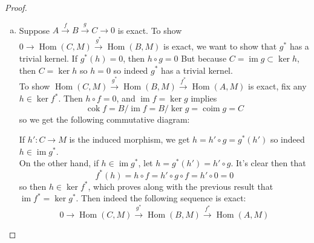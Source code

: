 \documentclass{article}
\DeclareMathOperator{\im}{im}
\DeclareMathOperator{\coim}{coim}
\DeclareMathOperator{\cok}{cok}
\DeclareMathOperator{\Hom}{Hom}
\begin{document}
\begin{proof}
\begin{enumerate}[(a)]
    \item 
    Suppose $A\xrightarrow{f}B\xrightarrow{g}C\rightarrow 0$ is exact. To show $0\rightarrow \Hom(C,M) \xrightarrow{g^*} \Hom(B,M)$ is exact, we want to show that $g^*$ has a trivial kernel. If $g^*(h)=0$, then $h\circ g=0$ But because $C=\im g\subset \ker h$, then $C=\ker h$ so $h=0$ so indeed $g^*$ has a trivial kernel.\\
    To show $\Hom(C,M)\xrightarrow{g^*} \Hom(B,M) \xrightarrow{f^*} \Hom(A,M)$ is exact, fix any $h\in \ker f^*$. Then $h\circ f=0$, and $\im f=\ker g$ implies 
    \[
    \cok f=B/\im f=B/\ker g=\coim g=C
    \]
    so we get the following commutative diagram:
    \begin{center}
    \end{center}
    If $h':C\to M$ is the induced morphism, we get $h=h'\circ g=g^*(h')$ so indeed $h\in \im g^*$.\\
    On the other hand, if $h\in \im g^*$, let $h=g^*(h')=h'\circ g$. It's clear then that
    \[
    f^*(h)=h\circ f=h'\circ g\circ f=h'\circ 0=0
    \]
    so then $h\in \ker f^*$, which proves along with the previous result that $\im f^*=\ker g^*$. Then indeed the following sequence is exact:
    \[
    0\rightarrow \Hom(C,M) \xrightarrow{g^*} \Hom(B,M) \xrightarrow{f^*} \Hom(A,M)
    \]
    \end{enumerate}
    
\end{proof}
\end{document}
